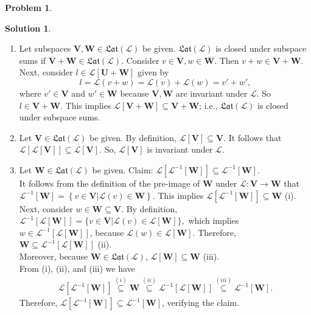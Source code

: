 \documentclass{article}
\theoremstyle{definition}
\newtheorem*{prob*}{Problem}
\newtheorem*{sln*}{Solution}
\newcommand{\V}{\mathbf{V}}
\newcommand{\W}{\mathbf{W}}
\newcommand{\U}{\mathbf{U}}
\newcommand{\lag}{\mathcal{L}}
\begin{document}
\begin{prob*}
\begin{sln*}
\begin{enumerate}
			\item Let subspaces $\V,\W \in \mathfrak{Lat}(\lag)$ be given. $\mathfrak{Lat}(\lag)$ is closed under subspace sums if $\V + \W \in \mathfrak{Lat}(\lag)$. Consider $v\in\V, w\in\W$. Then $v+w \in \V + \W$. Next, consider $l\in \lag[\U+\W]$ given by
			$$l = \lag(v+w) = \lag(v) + \lag(w) = v' + w',$$
			where $v'\in \V$ and $w'\in\W$ because $\V,\W$ are invariant under $\lag$. So $l \in \V+\W$. This implies $ \lag[\V+\W] \subseteq \V+\W $; i.e., $\mathfrak{Lat}(\lag)$ is closed under subspace sums.    \\
			
			\item Let $\V \in \mathfrak{Lat}(\lag)$ be given. By definition, $\lag[\V] \subseteq \V$. It follows that $\lag\left[ \lag[\V] \right] \subseteq \lag[\V]$. So, $\lag[\V]$ is invariant under $\lag$.\\
			
			\item Let $\W \in \mathfrak{Lat}(\lag)$ be given. Claim: $\lag\left[\lag^{-1}[\W] \right] \subseteq \lag^{-1}[\W] $.\\
			
			It follows from the definition of the pre-image of $\W$ under $\lag : \V \to \W$ that $\lag^{-1}[\W] = \left\{ v \in \V \vert \lag(v) \in \W \right\}$. This implies $\lag\left[\lag^{-1}[\W]\right] \subseteq \W$ (i).\\
			
			Next, consider $w\in\W \subseteq \V$. By definition, $\lag^{-1}\left[\lag[\W] \right] = \{ v\in \V \vert \lag(v) \in \lag[\W]\},$ which implies $w \in \lag^{-1}[
			\lag[\W]]$, because $\lag(w) \in \lag[\W]$. Therefore, $\W \subseteq \lag^{-1}\left[\lag[\W]\right]$ (ii).\\   
			
			Moreover, because $\W \in \mathfrak{Lat}(\lag)$, $\lag[\W] \subseteq \W$ (iii).\\ 
			
			From (i), (ii), and (iii) we have
			\begin{align*}
			\lag\left[ \lag^{-1}[\W] \right] \stackrel{(i)}\subseteq \W \stackrel{(ii)}\subseteq \lag^{-1}\left[ \lag[\W] \right] \stackrel{(iii)}\subseteq \lag^{-1}[\W].
			\end{align*} 
			Therefore, $\lag\left[ \lag^{-1}[\W] \right] \subseteq \lag^{-1}[\W] $, verifying the claim.
			
			
		\end{enumerate}
	\end{sln*}
	
\end{prob*}
\end{document}
